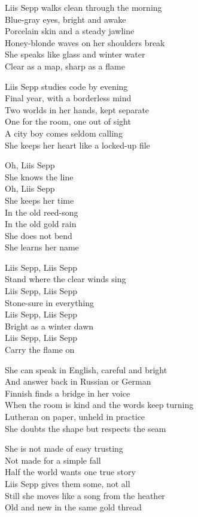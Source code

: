 \begin{lyrics}
Liis Sepp walks clean through the morning\\
Blue-gray eyes, bright and awake\\
Porcelain skin and a steady jawline\\
Honey-blonde waves on her shoulders break\\
She speaks like glass and winter water\\
Clear as a map, sharp as a flame

Liis Sepp studies code by evening\\
Final year, with a borderless mind\\
Two worlds in her hands, kept separate\\
One for the room, one out of sight\\
A city boy comes seldom calling\\
She keeps her heart like a locked-up file

Oh, Liis Sepp\\
She knows the line\\
Oh, Liis Sepp\\
She keeps her time\\
In the old reed-song\\
In the old gold rain\\
She does not bend\\
She learns her name

Liis Sepp, Liis Sepp\\
Stand where the clear winds sing\\
Liis Sepp, Liis Sepp\\
Stone-sure in everything\\
Liis Sepp, Liis Sepp\\
Bright as a winter dawn\\
Liis Sepp, Liis Sepp\\
Carry the flame on

She can speak in English, careful and bright\\
And answer back in Russian or German\\
Finnish finds a bridge in her voice\\
When the room is kind and the words keep turning\\
Lutheran on paper, unheld in practice\\
She doubts the shape but respects the seam

She is not made of easy trusting\\
Not made for a simple fall\\
Half the world wants one true story\\
Liis Sepp gives them some, not all\\
Still she moves like a song from the heather\\
Old and new in the same gold thread


\end{lyrics}
